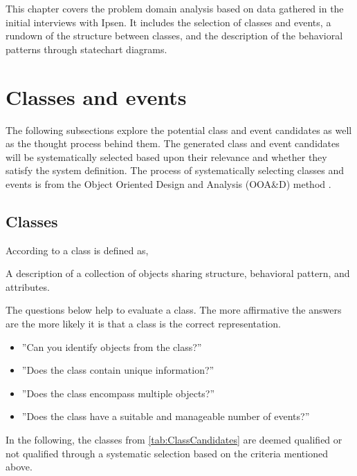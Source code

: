 This chapter covers the problem domain analysis based on data gathered in the initial interviews with Ipsen.
It includes the selection of classes and events, a rundown of the structure between classes, and the description of the behavioral patterns through statechart diagrams.

\section{Classes and events}\label{sec:ClassEvent}
The following subsections explore the potential class and event candidates as well as the thought process behind them.
The generated class and event candidates will be systematically selected based upon their relevance and whether they satisfy the system definition.
The process of systematically selecting classes and events is from the Object Oriented Design and Analysis (OOA\&D) method \cite{Rod-Aalborg}.

\subsection{Classes} \label{sec:Classes}
According to  \citep[p.~55]{Rod-Aalborg} a class is defined as,
\begin{defn}\label{defn:class}
	A description of a collection of objects sharing structure, behavioral pattern, and attributes.
\end{defn}

The questions below help to evaluate a class. The more affirmative the answers are the more likely it is that a class is the correct representation. \citep[p.~63]{Rod-Aalborg}
\begin{itemize}
	\item ''Can you identify objects from the class?''
	\item ''Does the class contain unique information?''
	\item ''Does the class encompass multiple objects?''
	\item ''Does the class have a suitable and manageable number of events?''
\end{itemize}

In the following, the classes from \cref{tab:ClassCandidates} are deemed qualified or not qualified through a systematic selection based on the criteria mentioned above.

